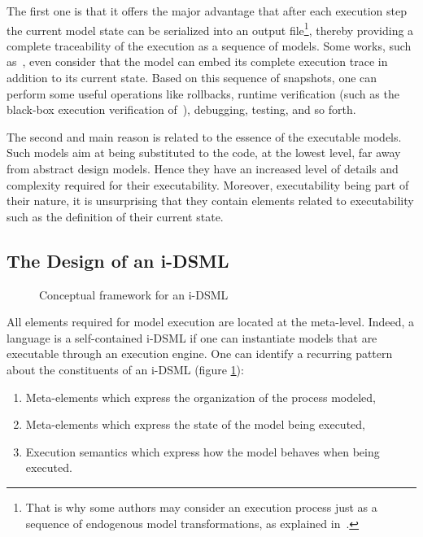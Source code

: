 \documentclass[english, 10pt]{llncs}
\begin{document}
The first one is that it offers the major advantage that after each
execution step the current model state can be serialized into an
output file\footnote{That is why some authors may consider an
  execution process just as a sequence of endogenous model
  transformations, as explained in~\cite{cariou-ecmfa11}.}, thereby
providing a complete traceability of the execution as a sequence of
models. Some works, such as~\cite{breton01}, even
consider that the model can embed its complete execution trace in
addition to its current state. Based on this sequence of snapshots,
one can perform some useful operations like rollbacks, runtime
verification (such as the black-box execution verification
of~\cite{cariou-ecmfa11}), debugging, testing, and so forth.

The second and main reason is related to the essence of the executable
models. Such models aim at being substituted to the code, at the
lowest level, far away from abstract design models. Hence they have an
increased level of details and complexity required for their
executability. Moreover, executability being part of their nature, it
is unsurprising that they contain elements related to executability
such as the definition of their current state.

\subsection{The Design of an i-DSML}


\begin{figure}[htbp]
\begin{center}
\caption{Conceptual framework for an i-DSML}
\label{iDSML}
\end{center}
\end{figure}


All elements required for model execution are located at the
meta-level. Indeed, a language is a self-contained i-DSML if one can
instantiate models that are executable through an execution
engine. One can identify a recurring pattern~\cite{combemale-apsec12}
about the constituents of an i-DSML (figure \ref{iDSML}):
\begin{enumerate}
	\item Meta-elements which express the organization of the process modeled,
	\item Meta-elements which express the state of the model being executed,
	\item Execution semantics which express how the model behaves when being executed.
\end{enumerate}
\end{document}
